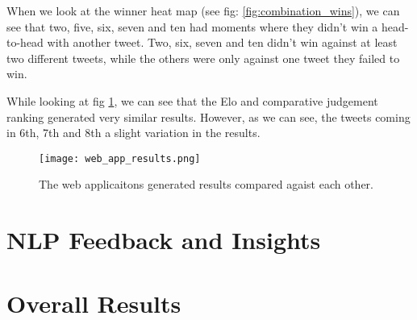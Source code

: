 When we look at the winner heat map (see fig: \ref{fig:combination_wins}), we can see that two, five, six, seven and ten had moments where they didn't win a head-to-head with another tweet. Two, six, seven and ten didn't win against at least two different tweets, while the others were only against one tweet they failed to win.


While looking at fig \ref{fig:web_app_results}, we can see that the Elo and comparative judgement ranking generated very similar results. However, as we can see, the tweets coming in 6th, 7th and 8th a slight variation in the results.

\begin{figure}[h]
	\centering
	\texttt{[image: web\_app\_results.png]}
	\caption{The web applicaitons generated results compared agaist each other.}
	\label{fig:web_app_results}
	
\end{figure}

\section{NLP Feedback and Insights}
\label{sec:reaults_NLP}

\section{Overall Results}
\label{sec:reaults_NLP}

